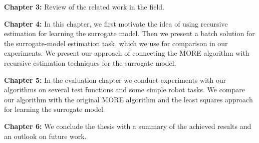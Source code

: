 \textbf{Chapter 3:} Review of the related work in the field.

\textbf{Chapter 4:} In this chapter, we first motivate the idea of
using recursive estimation for learning the surrogate model.
Then we present a batch solution for the
surrogate-model estimation task, which we use for comparison
in our experiments.
We present our approach of connecting
the MORE algorithm with recursive estimation techniques for the 
surrogate model.

\textbf{Chapter 5:} In the evaluation chapter we conduct experiments
with our algorithms on several test functions and some simple robot tasks.
We compare our algorithm with the original MORE algorithm
and the least squares approach for learning the surrogate model.

\textbf{Chapter 6:} We conclude the thesis with a summary of
the achieved results and an outlook on future work.